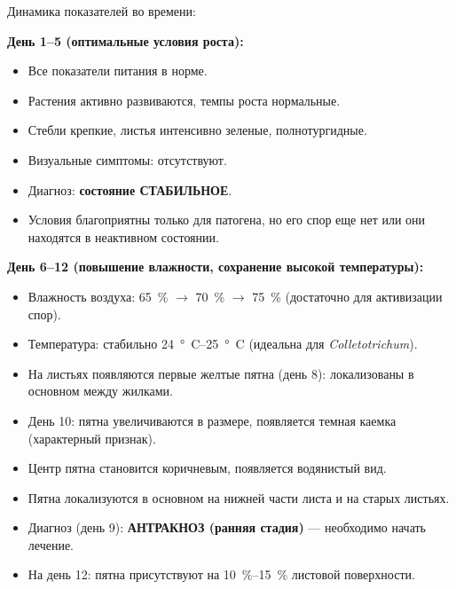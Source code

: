 Динамика показателей во времени:

\textbf{День 1--5 (оптимальные условия роста):}
\begin{itemize}
    \item Все показатели питания в норме.
    \item Растения активно развиваются, темпы роста нормальные.
    \item Стебли крепкие, листья интенсивно зеленые, полнотургидные.
    \item Визуальные симптомы: отсутствуют.
    \item Диагноз: \textbf{состояние СТАБИЛЬНОЕ}.
    \item Условия благоприятны только для патогена, но его спор еще нет или они находятся в неактивном состоянии.
\end{itemize}

\textbf{День 6--12 (повышение влажности, сохранение высокой температуры):}
\begin{itemize}
    \item Влажность воздуха: \SI{65}{\percent} $\to$ \SI{70}{\percent} $\to$ \SI{75}{\percent} (достаточно для активизации спор).
    \item Температура: стабильно \SIrange{24}{25}{\degree C} (идеальна для \textit{Colletotrichum}).
    \item На листьях появляются первые желтые пятна (день \num{8}): локализованы в основном между жилками.
    \item День 10: пятна увеличиваются в размере, появляется темная каемка (характерный признак).
    \item Центр пятна становится коричневым, появляется водянистый вид.
    \item Пятна локализуются в основном на нижней части листа и на старых листьях.
    \item Диагноз (день \num{9}): \textbf{АНТРАКНОЗ (ранняя стадия)} --- необходимо начать лечение.
    \item На день 12: пятна присутствуют на \SIrange{10}{15}{\percent} листовой поверхности.
\end{itemize}

